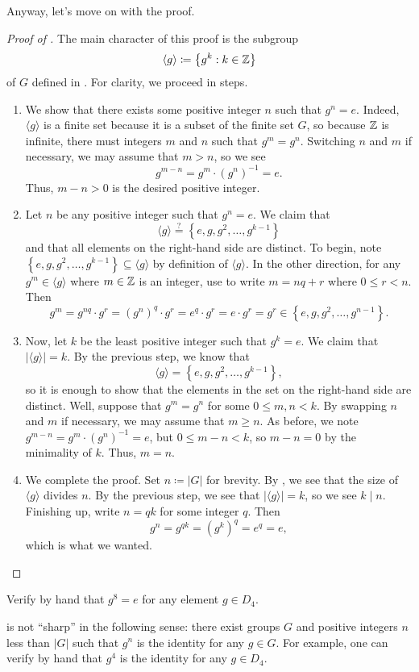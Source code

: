 \documentclass[../notes.tex]{subfiles}
\begin{document}
Anyway, let's move on with the proof.
\begin{proof}[Proof of ]
    The main character of this proof is the subgroup
    \[\langle g\rangle\coloneqq\left\{g^k:k\in\mathbb Z\right\}\]
    of $G$ defined in . For clarity, we proceed in steps.
    \begin{enumerate}
        \item We show that there exists some positive integer $n$ such that $g^n=e$. Indeed, $\langle g\rangle$ is a finite set because it is a subset of the finite set $G$, so because $\mathbb Z$ is infinite, there must integers $m$ and $n$ such that $g^m=g^n$. Switching $n$ and $m$ if necessary, we may assume that $m>n$, so we see
        \[g^{m-n}=g^m\cdot\left(g^n\right)^{-1}=e.\]
        Thus, $m-n>0$ is the desired positive integer.
        \item Let $n$ be any positive integer such that $g^n=e$. We claim that
        \[\langle g\rangle\stackrel?=\left\{e,g,g^2,\ldots,g^{k-1}\right\}\]
        and that all elements on the right-hand side are distinct. To begin, note $\left\{e,g,g^2,\ldots,g^{k-1}\right\}\subseteq\langle g\rangle$ by definition of $\langle g\rangle$. In the other direction, for any $g^{m}\in\langle g\rangle$ where $m\in\mathbb Z$ is an integer, use  to write $m=nq+r$ where $0\le r<n$. Then
        \[g^{m}=g^{nq}\cdot g^r=\left(g^n\right)^q\cdot g^r=e^q\cdot g^r=e\cdot g^r=g^r\in\left\{e,g,g^2,\ldots,g^{n-1}\right\}.\]
        \item Now, let $k$ be the least positive integer such that $g^k=e$. We claim that $\left|\langle g\rangle\right|=k$. By the previous step, we know that
        \[\langle g\rangle=\left\{e,g,g^2,\ldots,g^{k-1}\right\},\]
        so it is enough to show that the elements in the set on the right-hand side are distinct. Well, suppose that $g^m=g^n$ for some $0\le m,n<k$. By swapping $n$ and $m$ if necessary, we may assume that $m\ge n$. As before, we note $g^{m-n}=g^m\cdot\left(g^n\right)^{-1}=e$, but $0\le m-n<k$, so $m-n=0$ by the minimality of $k$. Thus, $m=n$.
        \item We complete the proof. Set $n\coloneqq\left|G\right|$ for brevity. By , we see that the size of $\langle g\rangle$ divides $n$. By the previous step, we see that $\left|\langle g\rangle\right|=k$, so we see $k\mid n$. Finishing up, write $n=qk$ for some integer $q$. Then
        \[g^n=g^{qk}=\left(g^k\right)^q=e^q=e,\]
        which is what we wanted.
        \qedhere
    \end{enumerate}
\end{proof}
\begin{exe}
    Verify by hand that $g^8=e$ for any element $g\in D_4$.
\end{exe}
\begin{remark}
     is not ``sharp'' in the following sense: there exist groups $G$ and positive integers $n$ less than $\left|G\right|$ such that $g^n$ is the identity for any $g\in G$. For example, one can verify by hand that $g^4$ is the identity for any $g\in D_4$.
\end{remark}
\end{document}
